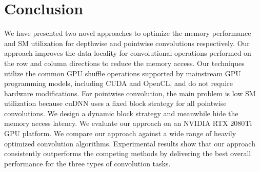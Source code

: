 \section{Conclusion}
We have presented two novel approaches to optimize the memory performance and SM utilization for depthwise and pointwise convolutions respectively. 
Our approach improves the data locality for convolutional operations performed on the row and column directions to reduce the memory access. 
Our techniques utilize the common GPU shuffle operations supported by mainstream GPU programming models, including CUDA and OpenCL, and do not require hardware modifications.
For pointwise convolution, the main problem is low SM utilization because cuDNN uses a fixed block strategy for all pointwise convolutions. We design a dynamic block strategy and meanwhile hide the memory access latency. 
We evaluate our approach on an NVIDIA RTX 2080Ti GPU platform. 
We compare our approach against a wide range of heavily optimized convolution algorithms. 
Experimental results show that our approach consistently outperforms the competing methods by delivering the best overall performance for the three types of
convolution tasks.




